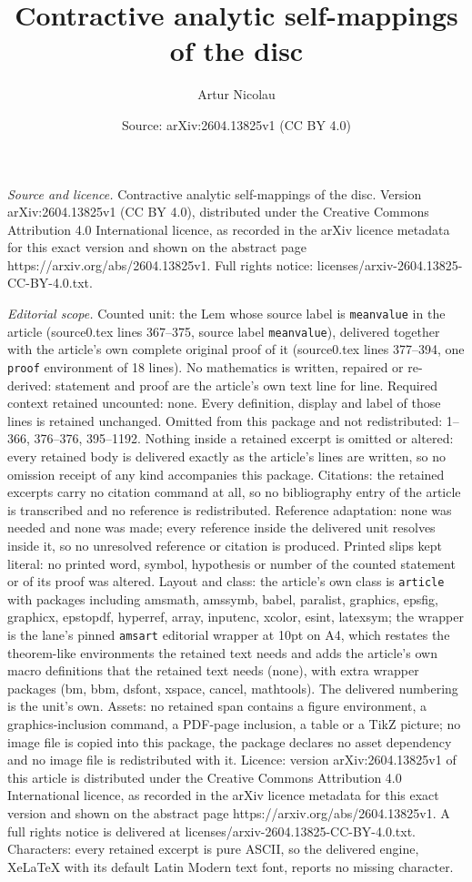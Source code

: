 \documentclass[10pt,a4paper]{amsart}
\title[Contractive analytic self-mappings of the disc]{Contractive analytic self-mappings of the disc}
\author{Artur Nicolau}
\date{Source: arXiv:2604.13825v1 (CC BY 4.0)}
\begin{document}
\maketitle

\noindent\emph{Source and licence.} Contractive analytic self-mappings of the disc. Version arXiv:2604.13825v1 (CC BY 4.0), distributed under the Creative Commons Attribution 4.0 International licence, as recorded in the arXiv licence metadata for this exact version and shown on the abstract page https://arxiv.org/abs/2604.13825v1. Full rights notice: licenses/arxiv-2604.13825-CC-BY-4.0.txt.\par\smallskip

\noindent\textit{Editorial scope.} Counted unit: the Lem whose source label is \texttt{meanvalue} in the article (source0.tex lines 367--375, source label \texttt{meanvalue}), delivered together with the article's own complete original proof of it (source0.tex lines 377--394, one \texttt{proof} environment of 18 lines). No mathematics is written, repaired or re-derived: statement and proof are the article's own text line for line. Required context retained uncounted: none. Every definition, display and label of those lines is retained unchanged. Omitted from this package and not redistributed: 1--366, 376--376, 395--1192. Nothing inside a retained excerpt is omitted or altered: every retained body is delivered exactly as the article's lines are written, so no omission receipt of any kind accompanies this package. Citations: the retained excerpts carry no citation command at all, so no bibliography entry of the article is transcribed and no reference is redistributed. Reference adaptation: none was needed and none was made; every reference inside the delivered unit resolves inside it, so no unresolved reference or citation is produced. Printed slips kept literal: no printed word, symbol, hypothesis or number of the counted statement or of its proof was altered. Layout and class: the article's own class is \texttt{article} with packages including amsmath, amssymb, babel, paralist, graphics, epsfig, graphicx, epstopdf, hyperref, array, inputenc, xcolor, esint, latexsym; the wrapper is the lane's pinned \texttt{amsart} editorial wrapper at 10pt on A4, which restates the theorem-like environments the retained text needs and adds the article's own macro definitions that the retained text needs (none), with extra wrapper packages (bm, bbm, dsfont, xspace, cancel, mathtools). The delivered numbering is the unit's own. Assets: no retained span contains a figure environment, a graphics-inclusion command, a PDF-page inclusion, a table or a TikZ picture; no image file is copied into this package, the package declares no asset dependency and no image file is redistributed with it. Licence: version arXiv:2604.13825v1 of this article is distributed under the Creative Commons Attribution 4.0 International licence, as recorded in the arXiv licence metadata for this exact version and shown on the abstract page https://arxiv.org/abs/2604.13825v1. A full rights notice is delivered at licenses/arxiv-2604.13825-CC-BY-4.0.txt. Characters: every retained excerpt is pure ASCII, so the delivered engine, XeLaTeX with its default Latin Modern text font, reports no missing character.
\end{document}
